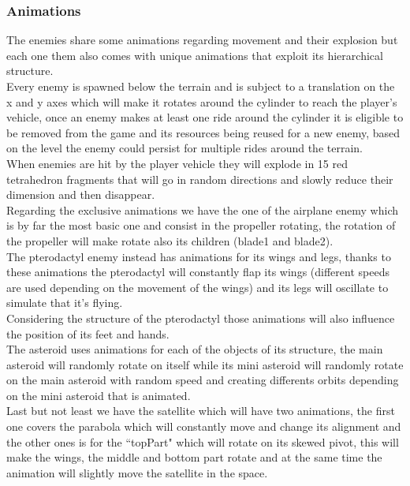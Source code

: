 \documentclass[a4paper,11pt]{article}
\begin{document}
\subsubsection{Animations}
The enemies share some animations regarding movement and their explosion but each one them also comes with unique animations that exploit its hierarchical structure.\\
Every enemy is spawned below the terrain and is subject to a translation on the x and y axes which will make it rotates around the cylinder to reach the player's vehicle, once an enemy makes at least one ride around the cylinder it is eligible to be removed from the game and its resources being reused for a new enemy, based on the level the enemy could persist for multiple rides around the terrain.\\
When enemies are hit by the player vehicle they will explode in 15 red tetrahedron fragments that will go in random directions and slowly reduce their dimension and then disappear.\\
Regarding the exclusive animations we have the one of the airplane enemy which is by far the most basic one and consist in the propeller rotating, the rotation of the propeller will make rotate also its children (blade1 and blade2).\\
The pterodactyl enemy instead has animations for its wings and legs, thanks to these animations the pterodactyl will constantly flap its wings (different speeds are used depending on the movement of the wings) and its legs will oscillate to simulate that it's flying.\\
Considering the structure of the pterodactyl those animations will also influence the position of its feet and hands.\\
The asteroid uses animations for each of the objects of its structure, the main asteroid will randomly rotate on itself while its mini asteroid will randomly rotate on the main asteroid with random speed and creating differents orbits depending on the mini asteroid that is animated.\\
Last but not least we have the satellite which will have two animations, the first one covers the parabola which will constantly move and change its alignment and the other ones is for the ``topPart" which will rotate on its skewed pivot, this will make the wings, the middle and bottom part rotate and at the same time the animation will slightly move the satellite in the space.\\
\end{document}
